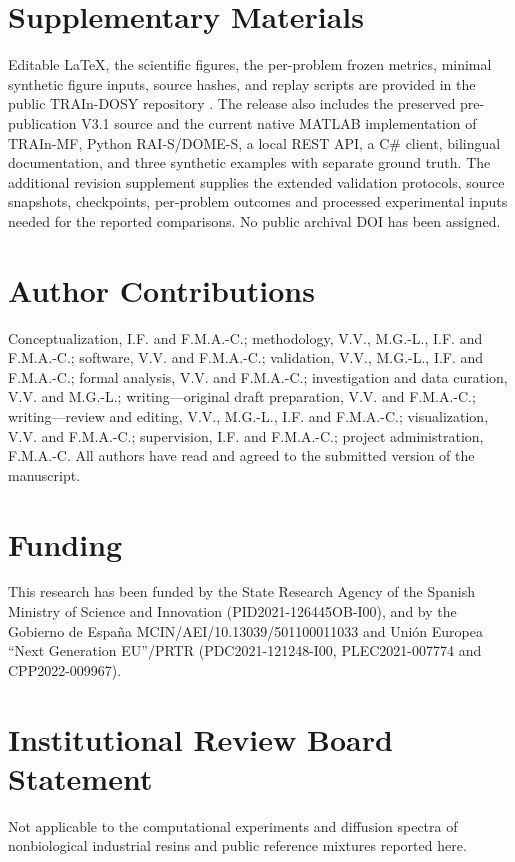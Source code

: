 \section*{Supplementary Materials}
Editable LaTeX, the scientific figures, the per-problem frozen metrics, minimal synthetic figure inputs, source hashes, and replay scripts are provided in the public TRAIn-DOSY repository \cite{software}. The release also includes the preserved pre-publication V3.1 source and the current native MATLAB implementation of TRAIn-MF, Python RAI-S/DOME-S, a local REST API, a C\# client, bilingual documentation, and three synthetic examples with separate ground truth. The additional revision supplement supplies the extended validation protocols, source snapshots, checkpoints, per-problem outcomes and processed experimental inputs needed for the reported comparisons. No public archival DOI has been assigned.

\section*{Author Contributions}


Conceptualization, I.F. and F.M.A.-C.; methodology, V.V., M.G.-L., I.F. and F.M.A.-C.; software, V.V. and F.M.A.-C.; validation, V.V., M.G.-L., I.F. and F.M.A.-C.; formal analysis, V.V. and F.M.A.-C.; investigation and data curation, V.V. and M.G.-L.; writing---original draft preparation, V.V. and F.M.A.-C.; writing---review and editing, V.V., M.G.-L., I.F. and F.M.A.-C.; visualization, V.V. and F.M.A.-C.; supervision, I.F. and F.M.A.-C.; project administration, F.M.A.-C. All authors have read and agreed to the submitted version of the manuscript.

\section*{Funding}
This research has been funded by the State Research Agency of the Spanish Ministry of Science and Innovation (PID2021-126445OB-I00), and by the Gobierno de Espa\~na MCIN/AEI/10.13039/501100011033 and Uni\'on Europea ``Next Generation EU''/PRTR (PDC2021-121248-I00, PLEC2021-007774 and CPP2022-009967).

\section*{Institutional Review Board Statement}
Not applicable to the computational experiments and diffusion spectra of nonbiological industrial resins and public reference mixtures reported here.

